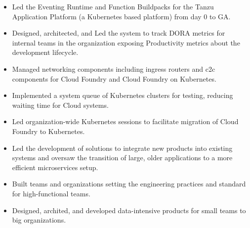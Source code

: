 \documentclass[10pt,a4paper,ragged2e,withhyper]{altacv}
\begin{document}
\begin{paracol}{2}


\begin{itemize}
    \item Led the Eventing Runtime and Function Buildpacks for the Tanzu Application Platform (a Kubernetes based platform) from day 0 to GA.
    \item Designed, architected, and Led the system to track DORA metrics for internal teams in the organization exposing Productivity metrics about the development lifecycle.
\end{itemize}
\divider

\begin{itemize}
    \item Managed networking components including ingress routers and c2c components for Cloud Foundry and Cloud Foundry on Kubernetes.
    \item Implemented a system queue of Kubernetes clusters for testing, reducing waiting time for Cloud systems.
    \item Led organization-wide Kubernetes sessions to facilitate migration of Cloud Foundry to Kubernetes.
\end{itemize}

\divider

\begin{itemize}
    \item Led the development of solutions to integrate new products into existing systems and oversaw the transition of large, older applications to a more efficient microservices setup.
    \item Built teams and organizations setting the engineering practices and standard for high-functional teams.
\end{itemize}

\divider

\begin{itemize}
    \item Designed, archited, and developed data-intensive products for small teams to big organizations.
\end{itemize}


\end{paracol}
\end{document}
